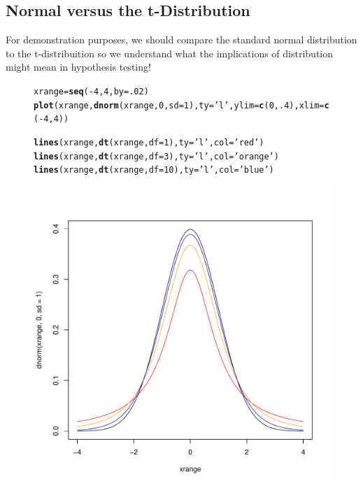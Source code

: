 \documentclass{tufte-handout}\usepackage[]{graphicx}\usepackage[]{color}
\makeatletter
\def\maxwidth{ %
  \ifdim\Gin@nat@width>\linewidth
    \linewidth
  \else
    \Gin@nat@width
  \fi
}
\newcommand{\hlnum}[1]{\textcolor[rgb]{0.686,0.059,0.569}{#1}}%
\newcommand{\hlstr}[1]{\textcolor[rgb]{0.192,0.494,0.8}{#1}}%
\newcommand{\hlopt}[1]{\textcolor[rgb]{0,0,0}{#1}}%
\newcommand{\hlstd}[1]{\textcolor[rgb]{0.345,0.345,0.345}{#1}}%
\newcommand{\hlkwb}[1]{\textcolor[rgb]{0.69,0.353,0.396}{#1}}%
\newcommand{\hlkwc}[1]{\textcolor[rgb]{0.333,0.667,0.333}{#1}}%
\newcommand{\hlkwd}[1]{\textcolor[rgb]{0.737,0.353,0.396}{\textbf{#1}}}%
\newenvironment{kframe}{%
 \def\at@end@of@kframe{}%
 \ifinner\ifhmode%
  \def\at@end@of@kframe{\end{minipage}}%
  \begin{minipage}{\columnwidth}%
 \fi\fi%
 \def\FrameCommand##1{\hskip\@totalleftmargin \hskip-\fboxsep
 \colorbox{shadecolor}{##1}\hskip-\fboxsep
     \hskip-\linewidth \hskip-\@totalleftmargin \hskip\columnwidth}%
 \MakeFramed {\advance\hsize-\width
   \@totalleftmargin\z@ \linewidth\hsize
   \@setminipage}}%
 {\par\unskip\endMakeFramed%
 \at@end@of@kframe}
\newenvironment{knitrout}{}{} %
\makeatother
\begin{document}
\subsection{Normal versus the t-Distribution}

For demonstration purposes, we should compare the standard normal distribution to the t-distribuition so we understand what the implications of distribution might mean in hypothesis testing!

\begin{figure}
\begin{knitrout}
\color{fgcolor}\begin{kframe}
\begin{alltt}
\hlstd{xrange} \hlkwb{=} \hlkwd{seq}\hlstd{(}\hlopt{-}\hlnum{4}\hlstd{,} \hlnum{4}\hlstd{,} \hlkwc{by}\hlstd{=}\hlnum{.02}\hlstd{)}
\hlkwd{plot}\hlstd{(xrange,} \hlkwd{dnorm}\hlstd{(xrange,} \hlnum{0}\hlstd{,} \hlkwc{sd}\hlstd{=}\hlnum{1}\hlstd{),} \hlkwc{ty}\hlstd{=}\hlstr{'l'}\hlstd{,} \hlkwc{ylim}\hlstd{=}\hlkwd{c}\hlstd{(}\hlnum{0}\hlstd{,}\hlnum{.4}\hlstd{),} \hlkwc{xlim}\hlstd{=}\hlkwd{c}\hlstd{(}\hlopt{-}\hlnum{4}\hlstd{,}\hlnum{4}\hlstd{))}

\hlkwd{lines}\hlstd{(xrange,} \hlkwd{dt}\hlstd{(xrange,} \hlkwc{df}\hlstd{=}\hlnum{1}\hlstd{),} \hlkwc{ty}\hlstd{=}\hlstr{'l'}\hlstd{,} \hlkwc{col}\hlstd{=}\hlstr{'red'}\hlstd{)}
\hlkwd{lines}\hlstd{(xrange,} \hlkwd{dt}\hlstd{(xrange,} \hlkwc{df}\hlstd{=}\hlnum{3}\hlstd{),} \hlkwc{ty}\hlstd{=}\hlstr{'l'}\hlstd{,} \hlkwc{col}\hlstd{=}\hlstr{'orange'}\hlstd{)}
\hlkwd{lines}\hlstd{(xrange,} \hlkwd{dt}\hlstd{(xrange,} \hlkwc{df}\hlstd{=}\hlnum{10}\hlstd{),} \hlkwc{ty}\hlstd{=}\hlstr{'l'}\hlstd{,} \hlkwc{col}\hlstd{=}\hlstr{'blue'}\hlstd{)}
\end{alltt}
\end{kframe}
\includegraphics[width=\maxwidth]{figure/unnamed-chunk-23-1} 

\end{knitrout}
\end{figure}
\end{document}
